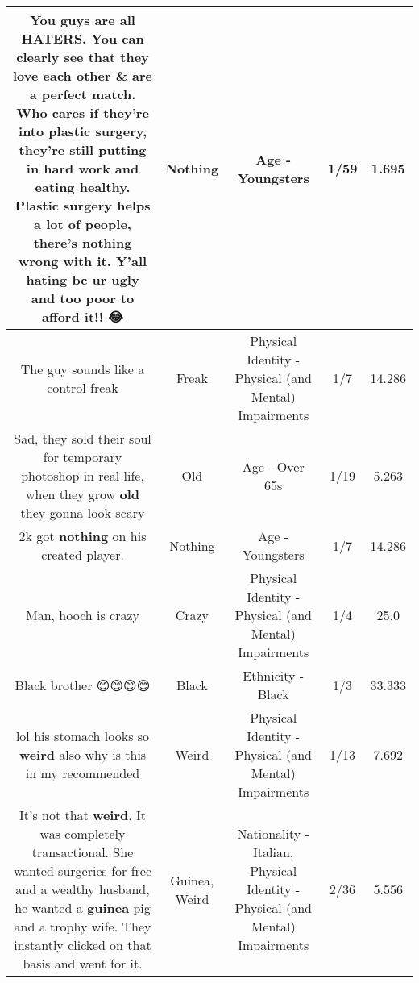 \documentclass[11pt]{article}
\newlength\mylength
\begin{document}
\begin{center}
\begin{longtable}{|C{.65\mylength}|C{.30\mylength}|C{.12\mylength}|C{.12\mylength}|C{.12\mylength}|}
  \small You guys are all HATERS. You can clearly see that they love each other \& are a perfect match. Who cares if they're into plastic surgery, they're still putting in hard work and eating healthy. Plastic surgery helps a lot of people, there's \textbf{nothing} wrong with it. Y'all hating bc ur ugly and too poor to afford it!! 😂\normalsize   & Nothing & Age - Youngsters & 1/59 & 1.695 \\  \hline
  \small The guy sounds like a control freak\normalsize   & Freak & Physical Identity - Physical (and Mental) Impairments & 1/7 & 14.286 \\  \hline
  \small Sad, they sold their soul for temporary photoshop in real life, when they grow \textbf{old} they gonna look scary\normalsize   & Old & Age - Over 65s & 1/19 & 5.263 \\  \hline
  \small 2k got \textbf{nothing} on his created player.\normalsize   & Nothing & Age - Youngsters & 1/7 & 14.286 \\  \hline
  \small Man, hooch is crazy\normalsize   & Crazy & Physical Identity - Physical (and Mental) Impairments & 1/4 & 25.0 \\  \hline
  \small Black brother 😊😊😊😊\normalsize   & Black & Ethnicity - Black & 1/3 & 33.333 \\  \hline
  \small lol his stomach looks so \textbf{weird} also why is this in my recommended\normalsize   & Weird & Physical Identity - Physical (and Mental) Impairments & 1/13 & 7.692 \\  \hline
  \small It's not that \textbf{weird}. It was completely transactional. She wanted surgeries for free and a wealthy husband, he wanted a \textbf{guinea} pig and a trophy wife. They instantly clicked on that basis and went for it.\normalsize   & Guinea, Weird & Nationality - Italian, Physical Identity - Physical (and Mental) Impairments & 2/36 & 5.556 \\  \hline

\end{longtable}
\end{center}
\end{document}
